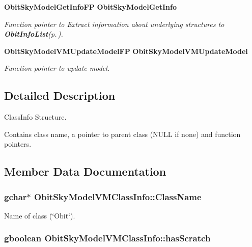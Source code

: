 \begin{CompactItemize}
{\bf Obit\-Sky\-Model\-Get\-Info\-FP} {\bf Obit\-Sky\-Model\-Get\-Info}
\begin{CompactList}\small\item\em Function pointer to Extract information about underlying structures to {\bf Obit\-Info\-List}{\rm (p.\,\pageref{structObitInfoList})}. \item\end{CompactList}\item 
{\bf Obit\-Sky\-Model\-VMUpdate\-Model\-FP} {\bf Obit\-Sky\-Model\-VMUpdate\-Model}
\begin{CompactList}\small\item\em Function pointer to update model. \item\end{CompactList}\end{CompactItemize}


\subsection{Detailed Description}
Class\-Info Structure. 

Contains class name, a pointer to parent class (NULL if none) and function pointers. 



\subsection{Member Data Documentation}
\subsubsection{\setlength{\rightskip}{0pt plus 5cm}gchar$\ast$ {\bf Obit\-Sky\-Model\-VMClass\-Info::Class\-Name}}\label{structObitSkyModelVMClassInfo_o2}


Name of class (\char`\"{}Obit\char`\"{}). 

\subsubsection{\setlength{\rightskip}{0pt plus 5cm}gboolean {\bf Obit\-Sky\-Model\-VMClass\-Info::has\-Scratch}}\label{structObitSkyModelVMClassInfo_o1}


